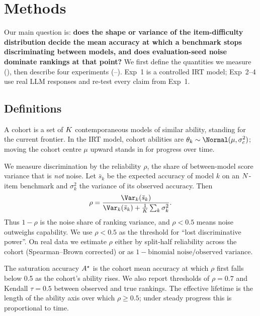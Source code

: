 \section{Methods}
\label{sec:method}

Our main question is: {\bf does the shape or variance of the item-difficulty distribution decide the mean accuracy at which a benchmark stops discriminating between models, and does evaluation-seed noise dominate rankings at that point?} We first define the quantities we measure (), then describe four experiments (--). Exp~1 is a controlled IRT model; Exp~2--4 use real LLM responses and re-test every claim from Exp~1.

\subsection{Definitions}
\label{sec:defs}

 A cohort is a set of $K$ contemporaneous models of similar ability, standing for the current frontier. In the IRT model, cohort abilities are $\theta_k \sim \Normal(\mu, \sigc^2)$; moving the cohort centre $\mu$ upward stands in for progress over time.

 We measure discrimination by the reliability $\rho$, the share of between-model score variance that is {\em not} noise. Let $\bar{s}_k$ be the expected accuracy of model $k$ on an $N$-item benchmark and $\sigma_k^2$ the variance of its observed accuracy. Then
\begin{equation}
\rho = \frac{\Var_k(\bar{s}_k)}{\Var_k(\bar{s}_k) + \frac{1}{\Kmod}\sum_k \sigma_k^2}.
\label{eq:rho}
\end{equation}
Thus $1-\rho$ is the noise share of ranking variance, and $\rho < 0.5$ means noise outweighs capability. We use $\rho < 0.5$ as the threshold for ``lost discriminative power''. On real data we estimate $\rho$ either by split-half reliability across the cohort (Spearman--Brown corrected) or as $1 - \text{binomial noise}/\text{observed variance}$.

 The saturation accuracy $A^{\star}$ is the cohort mean accuracy at which $\rho$ first falls below 0.5 as the cohort's ability rises. We also report thresholds of $\rho = 0.7$ and Kendall $\tau = 0.5$ between observed and true rankings. The effective lifetime is the length of the ability axis over which $\rho \ge 0.5$; under steady progress this is proportional to time.


